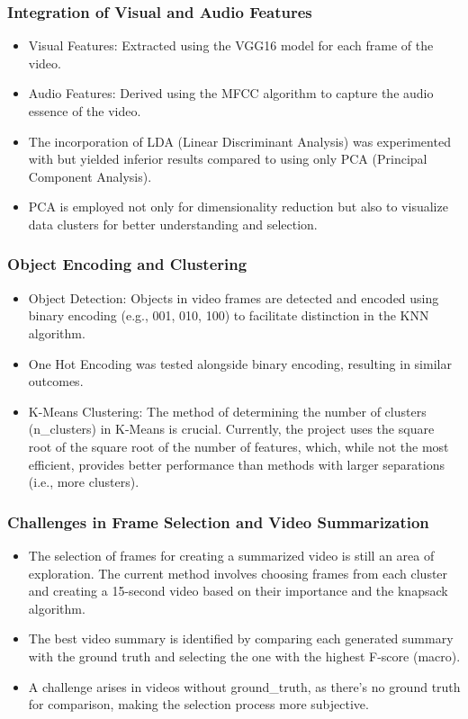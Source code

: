 \documentclass[conference]{IEEEtran}
\begin{document}
\subsubsection*{Integration of Visual and Audio Features}
\begin{itemize}
    \item Visual Features: Extracted using the VGG16 model for each frame of the video.
    \item Audio Features: Derived using the MFCC algorithm to capture the audio essence of the video.
    \item The incorporation of LDA (Linear Discriminant Analysis) was experimented with but yielded inferior results compared to using only PCA (Principal Component Analysis).
    \item PCA is employed not only for dimensionality reduction but also to visualize data clusters for better understanding and selection.
\end{itemize}

\subsubsection*{Object Encoding and Clustering}
\begin{itemize}
    \item Object Detection: Objects in video frames are detected and encoded using binary encoding (e.g., 001, 010, 100) to facilitate distinction in the KNN algorithm.
    \item One Hot Encoding was tested alongside binary encoding, resulting in similar outcomes.
    \item K-Means Clustering: The method of determining the number of clusters (n\_clusters) in K-Means is crucial. Currently, the project uses the square root of the square root of the number of features, which, while not the most efficient, provides better performance than methods with larger separations (i.e., more clusters).
\end{itemize}

\subsubsection*{Challenges in Frame Selection and Video Summarization}
\begin{itemize}
    \item The selection of frames for creating a summarized video is still an area of exploration. The current method involves choosing frames from each cluster and creating a 15-second video based on their importance and the knapsack algorithm.
    \item The best video summary is identified by comparing each generated summary with the ground truth and selecting the one with the highest F-score (macro).
    \item A challenge arises in videos without ground\_truth, as there's no ground truth for comparison, making the selection process more subjective.
\end{itemize}
\end{document}
